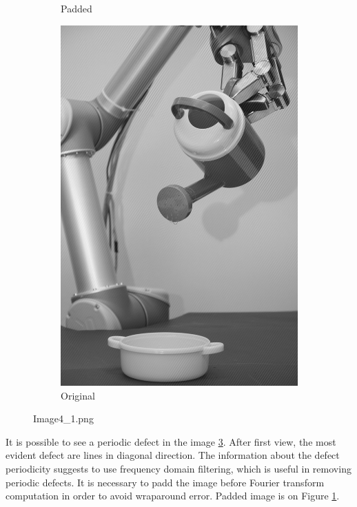 \documentclass[11pt]{article}
\numberwithin{equation}{section}
\begin{document}
\begin{figure}[h]
\begin{subfigure}[b]{0.3\textwidth}
		\caption{Padded}
		\label{fig:padded}
	\end{subfigure} \qquad
	\begin{subfigure}[b]{0.55\textwidth}
		\includegraphics[width=\textwidth]{fig/Image4_1.png}
		\caption{Original}
		\label{fig:image4_1}
	\end{subfigure}\qquad
	\caption{Image4\_1.png}
\end{figure}

It is possible to see a periodic defect in the image \ref{fig:image4_1}. After first view, the most evident defect are lines in diagonal direction. The information about the defect periodicity suggests to use frequency domain filtering, which is useful in removing periodic defects.
It is necessary to padd the image before Fourier transform computation in order to avoid wraparound error. Padded image is on Figure \ref{fig:padded}.
\end{document}
